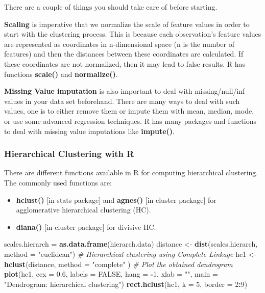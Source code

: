 \documentclass[
]{book}
\newenvironment{Shaded}{\begin{snugshade}}{\end{snugshade}}
\newcommand{\AttributeTok}[1]{\textcolor[rgb]{0.13,0.29,0.53}{#1}}
\newcommand{\CommentTok}[1]{\textcolor[rgb]{0.56,0.35,0.01}{\textit{#1}}}
\newcommand{\ConstantTok}[1]{\textcolor[rgb]{0.56,0.35,0.01}{#1}}
\newcommand{\DecValTok}[1]{\textcolor[rgb]{0.00,0.00,0.81}{#1}}
\newcommand{\FloatTok}[1]{\textcolor[rgb]{0.00,0.00,0.81}{#1}}
\newcommand{\FunctionTok}[1]{\textcolor[rgb]{0.13,0.29,0.53}{\textbf{#1}}}
\newcommand{\NormalTok}[1]{#1}
\newcommand{\OtherTok}[1]{\textcolor[rgb]{0.56,0.35,0.01}{#1}}
\newcommand{\SpecialCharTok}[1]{\textcolor[rgb]{0.81,0.36,0.00}{\textbf{#1}}}
\newcommand{\StringTok}[1]{\textcolor[rgb]{0.31,0.60,0.02}{#1}}
\begin{document}
There are a couple of things you should take care of before starting.

\textbf{Scaling} is imperative that we normalize the scale of feature values in order to start with the clustering process. This is because each observation's feature values are represented as coordinates in n-dimensional space (n is the number of features) and then the distances between these coordinates are calculated. If these coordinates are not normalized, then it may lead to false results. R has functions \textbf{scale()} and \textbf{normalize()}.

\textbf{Missing Value imputation} is also important to deal with missing/null/inf values in your data set beforehand. There are many ways to deal with such values, one is to either remove them or impute them with mean, median, mode, or use some advanced regression techniques. R has many packages and functions to deal with missing value imputations like \textbf{impute()}.

\hypertarget{hierarchical-clustering-with-r}{%
\subsubsection{Hierarchical Clustering with R}\label{hierarchical-clustering-with-r}}

There are different functions available in R for computing hierarchical clustering. The commonly used functions are:

\begin{itemize}
\item
  \textbf{hclust()} {[}in stats package{]} and \textbf{agnes()} {[}in cluster package{]} for agglomerative hierarchical clustering (HC).
\item
  \textbf{diana()} {[}in cluster package{]} for divisive HC.
\end{itemize}

\begin{Shaded}
\begin{Highlighting}[]
\NormalTok{scales.hierarch }\OtherTok{=} \FunctionTok{as.data.frame}\NormalTok{(hierarch.data)}
\NormalTok{distance }\OtherTok{\textless{}{-}} \FunctionTok{dist}\NormalTok{(scales.hierarch, }\AttributeTok{method =} \StringTok{"euclidean"}\NormalTok{)}
\CommentTok{\# Hierarchical clustering using Complete Linkage}
\NormalTok{hc1 }\OtherTok{\textless{}{-}} \FunctionTok{hclust}\NormalTok{(distance, }\AttributeTok{method =} \StringTok{"complete"}\NormalTok{ )}
\CommentTok{\# Plot the obtained dendrogram}
\FunctionTok{plot}\NormalTok{(hc1, }\AttributeTok{cex =} \FloatTok{0.6}\NormalTok{, }\AttributeTok{labels =} \ConstantTok{FALSE}\NormalTok{, }\AttributeTok{hang =} \SpecialCharTok{{-}}\DecValTok{1}\NormalTok{, }\AttributeTok{xlab =} \StringTok{""}\NormalTok{, }
     \AttributeTok{main =} \StringTok{"Dendrogram: hierarchical clustering"}\NormalTok{)}
\FunctionTok{rect.hclust}\NormalTok{(hc1, }\AttributeTok{k =} \DecValTok{5}\NormalTok{, }\AttributeTok{border =} \DecValTok{2}\SpecialCharTok{:}\DecValTok{9}\NormalTok{)}
\end{Highlighting}
\end{Shaded}
\end{document}
